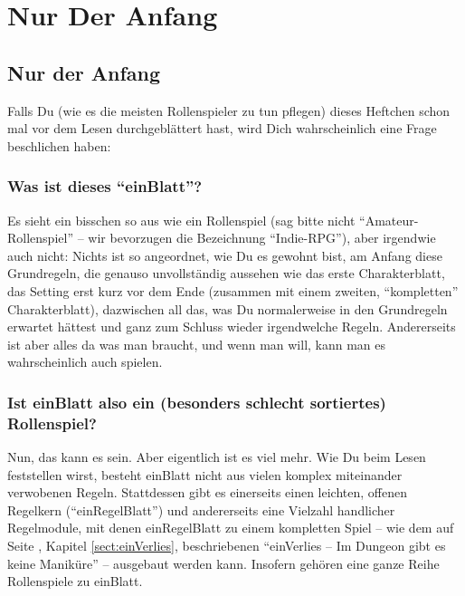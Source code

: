 \part {Nur Der Anfang}
\chapter {Nur der Anfang}

Falls Du (wie es die meisten Rollenspieler zu tun pflegen) dieses Heftchen schon mal vor dem Lesen durchgeblättert hast, wird Dich wahrscheinlich eine Frage beschlichen haben:

\section {Was ist dieses "`einBlatt"'?}
Es sieht ein bisschen so aus wie ein Rollenspiel (sag bitte nicht "`Amateur-Rollenspiel"' -- wir bevorzugen die Bezeichnung "`Indie-RPG"'), aber irgendwie auch nicht: Nichts ist so angeordnet, wie Du es gewohnt bist, am Anfang diese Grundregeln, die genauso unvollständig aussehen wie das erste Charakterblatt, das Setting erst kurz vor dem Ende (zusammen mit einem zweiten, "`kompletten"' Charakterblatt), dazwischen all das, was Du normalerweise in den Grundregeln erwartet hättest und ganz zum Schluss wieder irgendwelche Regeln. Andererseits ist aber alles da was man braucht, und wenn man will, kann man es wahrscheinlich auch spielen.

\section {Ist einBlatt also ein (besonders schlecht sortiertes) Rollenspiel?}
Nun, das kann es sein. Aber eigentlich ist es viel mehr. Wie Du beim Lesen feststellen wirst, besteht einBlatt nicht aus vielen komplex miteinander verwobenen Regeln. Stattdessen gibt es einerseits einen leichten, offenen Regelkern ("`einRegelBlatt"') und andererseits eine Vielzahl handlicher Regelmodule, mit denen einRegelBlatt zu einem kompletten Spiel -- wie dem  auf Seite \pageref {sect:einVerlies}, Kapitel \ref {sect:einVerlies}, beschriebenen "`einVerlies -- Im Dungeon gibt es keine Maniküre"' -- ausgebaut werden kann. Insofern gehören eine ganze Reihe Rollenspiele zu einBlatt. 

